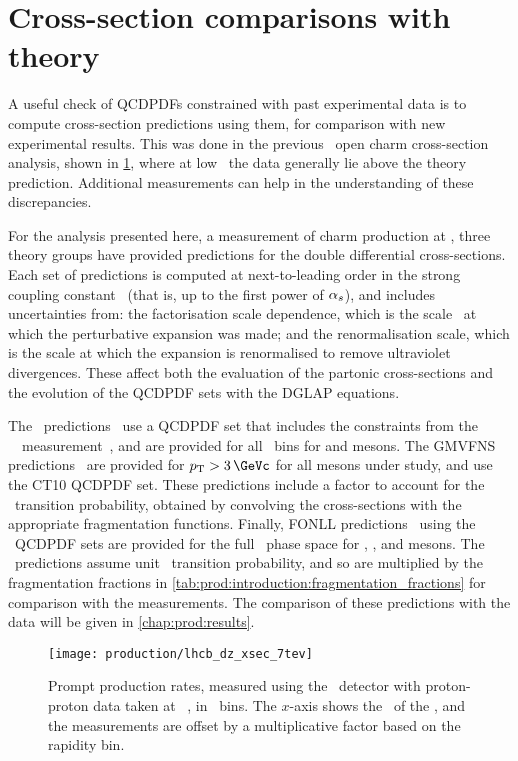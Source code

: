 \section{Cross-section comparisons with theory}
\label{chap:prod:theory:comparisons}

A useful check of \acp{QCDPDF} constrained with past experimental data is to 
compute cross-section predictions using them, for comparison with new 
experimental results.
This was done in the previous \lhcb\ open charm cross-section analysis, shown 
in \cref{fig:prod:theory:comparisons:7tev}, where at low \pT\ the data 
generally lie above the theory prediction.
Additional measurements can help in the understanding of these discrepancies.

For the analysis presented here, a measurement of charm production at 
, three theory groups have provided predictions for the double 
differential cross-sections.
Each set of predictions is computed at next-to-leading order in the strong 
coupling constant \alphas\ (that is, up to the first power of $\alpha_{s}$), and 
includes uncertainties from: the factorisation scale dependence, which is the 
scale \pdfqsquared\ at which the perturbative expansion was made; and the 
renormalisation scale, which is the scale at which the expansion is 
renormalised to remove ultraviolet divergences.
These affect both the evaluation of the partonic cross-sections and the 
evolution of the \ac{QCDPDF} sets with the \ac{DGLAP} equations.

The \nnpdfl\ predictions~\cite{Gauld:2015yia} use a \ac{QCDPDF} set that 
includes the constraints from the \ \lhcb\ 
measurement~\cite{LHCb-PAPER-2012-041}, and are provided for all \pTy\ bins for 
\PDz and \PDp mesons.
The \ac{GMVFNS} predictions~\cite{Kniehl:2012ti} are provided for $\pT > 
\SI{3}{\GeVc}$ for all mesons under study, and use the CT10 \ac{QCDPDF} set.
These predictions include a factor to account for the \cToHc\ transition 
probability, obtained by convolving the \decay{\ccbar}{\PHc} cross-sections 
with the appropriate fragmentation functions.
Finally, \ac{FONLL} predictions~\cite{Cacciari:2015fta} using the \nnpdf\ 
\ac{QCDPDF} sets are provided for the full \pTy\ phase space for \PDz, \PDp, 
and \PDstarp mesons.
The \fonll\ predictions assume unit \cToHc\ transition probability, and so are 
multiplied by the fragmentation fractions in 
\cref{tab:prod:introduction:fragmentation_fractions} for comparison with the 
measurements.
The comparison of these predictions with the data will be given in 
\cref{chap:prod:results}.

\begin{figure}
  \centering
  \texttt{[image: production/lhcb\_dz\_xsec\_7tev]}
  \caption{%
    Prompt \PDzero production rates, measured using the \lhcb\ detector with 
    proton-proton data taken at ~\cite{LHCb-PAPER-2012-041}, in 
    \pTy\ bins.
    The $x$-axis shows the \pT\ of the \PDzero, and the measurements are offset 
    by a multiplicative factor based on the rapidity bin.
  }
  \label{fig:prod:theory:comparisons:7tev}
\end{figure}
